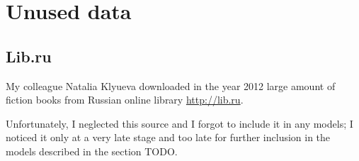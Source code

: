 \section{Unused data}
\subsection{Lib.ru}

My colleague Natalia Klyueva downloaded in the year 2012 large amount of fiction books from Russian online library \url{http://lib.ru}.

Unfortunately, I neglected this source and I forgot to include it in any models; I noticed it only at a very late stage and too late for further inclusion in the models described in the section TODO.

